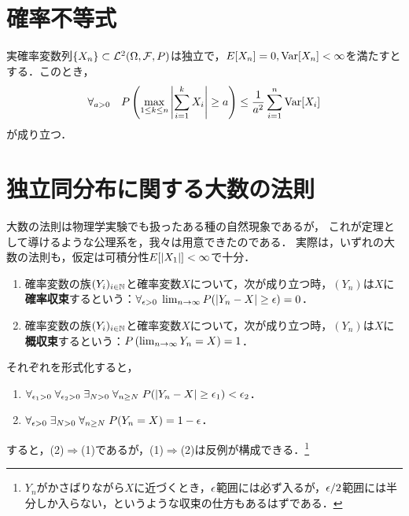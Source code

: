 \documentclass[uplatex,dvipdfmx]{jsreport}
\begin{document}
\section{確率不等式}

\begin{theorem}[Kolmogorov]\label{thm-Kolmogorov-inequality}
    実確率変数列$\{X_n\}\subset\mathcal{L}^2(\Omega,\mathcal{F},P)$は独立で，$E[X_n]=0,\mathrm{Var}[X_n]<\infty$を満たすとする．このとき，
    \[\forall_{a>0}\quad P\left(\max_{1\le k\le n}\left|\sum^k_{i=1}X_i\right|\ge a\right)\le\frac{1}{a^2}\sum^n_{i=1}\mathrm{Var}[X_i]\]
    が成り立つ．
\end{theorem}
\begin{remarks}[martingaleの萌芽]
    
\end{remarks}

\section{独立同分布に関する大数の法則}

\begin{tcolorbox}[colframe=ForestGreen, colback=ForestGreen!10!white,breakable,colbacktitle=ForestGreen!40!white,coltitle=black,fonttitle=\bfseries\sffamily,
title=]
    大数の法則は物理学実験でも扱ったある種の自然現象であるが，
    これが定理として導けるような公理系を，我々は用意できたのである．
    実際は，いずれの大数の法則も，仮定は可積分性$E[\lvert X_1\rvert]<\infty$で十分．
\end{tcolorbox}

\begin{definition}\mbox{}
    \begin{enumerate}
        \item 確率変数の族$(Y_i)_{i\in\mathbb{N}}$と確率変数$X$について，次が成り立つ時，$(Y_n)$は$X$に\textbf{確率収束}するという：$\forall_{\epsilon>0}\;\lim_{n\to\infty}P(\lvert Y_n-X\rvert\ge\epsilon)=0$．
        \item 確率変数の族$(Y_i)_{i\in\mathbb{N}}$と確率変数$X$について，次が成り立つ時，$(Y_n)$は$X$に\textbf{概収束}するという：$P\left(\lim_{n\to\infty}Y_n=X\right)=1$．
    \end{enumerate}
    それぞれを形式化すると，
    \begin{enumerate}
        \item $\forall_{\epsilon_1>0}\;\forall_{\epsilon_2>0}\;\exists_{N>0}\;\forall_{n\ge N}\;P(\left|Y_n-X\right|\ge\epsilon_1)<\epsilon_2$．
        \item $\forall_{\epsilon>0}\;\exists_{N>0}\;\forall_{n\ge N}\;P(Y_n=X)=1-\epsilon$．
    \end{enumerate}
    すると，(2)$\Rightarrow$(1)であるが，(1)$\Rightarrow$(2)は反例が構成できる．\footnote{$Y_n$がかさばりながら$X$に近づくとき，$\epsilon$範囲には必ず入るが，$\epsilon/2$範囲には半分しか入らない，というような収束の仕方もあるはずである．}
\end{definition}
\end{document}
